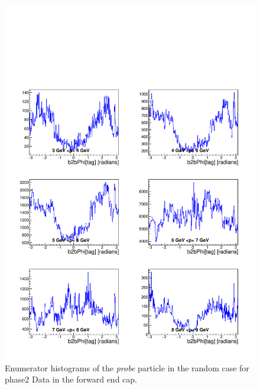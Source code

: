 \documentclass[a4paper,11pt,twosided,final,german,openbib,pdftex,listof=totoc,bibliography=totoc]{scrbook}
\begin{document}
\begin{appendix}
\begin{figure}[!htbp]
	\centering
	\includegraphics[width=\textwidth]{Plots/master/xPMPhiRandomFCE_Data}
	\caption[Momentum $\phi$ Random Forward End Cap Enumerator Histogram Phase2 Data]{Enumerator histograms of the \textit{probe} particle in the random case for phase2 Data in the forward end cap.}
	\label{plt:PMPhiRandomFCE_Data}
\end{figure}


\end{appendix}
\end{document}
